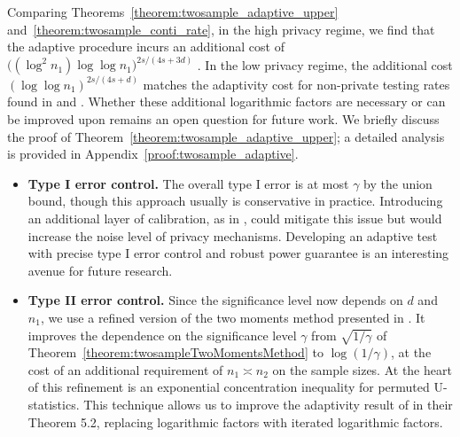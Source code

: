 \documentclass[twoside,11pt]{article}
\newcommand{\dimDensity}{d} %
\newcommand{\sampleSize}{n}
\begin{document}
%
%
\noindent
Comparing Theorems~\ref{theorem:twosample_adaptive_upper} and~\ref{theorem:twosample_conti_rate},
in the high privacy regime,
we find that the adaptive procedure incurs an additional cost of $\bigl( (\log^2{\sampleSize_1})  \log{\log{\sampleSize_1}} \bigr) ^{2s/(4s + 3\dimDensity)}$ . In the low privacy regime, the additional cost $(\log\log \sampleSize_1)^{2s/(4s + \dimDensity)}$ matches the adaptivity cost for non-private testing rates found in \citet{Fromont2006AdaptiveModel} and \citet{kim_minimax_2022}. Whether these additional logarithmic factors are necessary or can be improved upon remains an open question for future work.
We briefly discuss the proof of Theorem~\ref{theorem:twosample_adaptive_upper}; a detailed analysis is provided in Appendix~\ref{proof:twosample_adaptive}.
\begin{itemize}
	\item \textbf{Type I error control.} 
	The overall type I error is at most $\gamma$ by the union bound, though this approach usually is conservative in practice.   Introducing an additional layer of calibration, as in \citet{Schrab2021MMDTest}, could mitigate this issue but would increase the noise level of privacy mechanisms. Developing an adaptive test with precise type I error control and robust power guarantee is an interesting avenue for future research.
	
	\item \textbf{Type II error control.} 
	Since  the significance level now depends on $\dimDensity$ and $\sampleSize_1$, we use a refined version of the two moments method presented in \citet{kim_minimax_2022}. 
	It improves the dependence on the significance level $\gamma$
	from $\sqrt{1/{\gamma}}$ of Theorem~\ref{theorem:twosampleTwoMomentsMethod} to $\log(1/\gamma)$,
	at the cost of an additional requirement of $\sampleSize_1 \asymp \sampleSize_2$ on the sample sizes.
	At the heart of this refinement is an exponential concentration inequality for permuted U-statistics. This technique allows us to improve the adaptivity result of \citet{Lam-Weil2021MinimaxConstraint} in their Theorem 5.2, replacing logarithmic factors with iterated logarithmic factors. 
\end{itemize}
\end{document}
